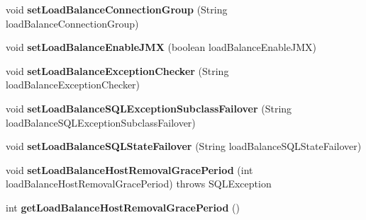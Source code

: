 \begin{DoxyCompactItemize}
void {\bfseries set\+Load\+Balance\+Connection\+Group} (String load\+Balance\+Connection\+Group)
\item 
\mbox{\label{classcom_1_1mysql_1_1jdbc_1_1_multi_host_my_s_q_l_connection_a1419d8c074ac22b801163e9b2eb5e1c7}} 
void {\bfseries set\+Load\+Balance\+Enable\+J\+MX} (boolean load\+Balance\+Enable\+J\+MX)
\item 
\mbox{\label{classcom_1_1mysql_1_1jdbc_1_1_multi_host_my_s_q_l_connection_aed4bfde5fc2c63060b4f3aec68188e06}} 
void {\bfseries set\+Load\+Balance\+Exception\+Checker} (String load\+Balance\+Exception\+Checker)
\item 
\mbox{\label{classcom_1_1mysql_1_1jdbc_1_1_multi_host_my_s_q_l_connection_a919d7aee542f3145d391d8612b4bba39}} 
void {\bfseries set\+Load\+Balance\+S\+Q\+L\+Exception\+Subclass\+Failover} (String load\+Balance\+S\+Q\+L\+Exception\+Subclass\+Failover)
\item 
\mbox{\label{classcom_1_1mysql_1_1jdbc_1_1_multi_host_my_s_q_l_connection_a203e4d05e4b3e87ebcdab8a84c49d3d1}} 
void {\bfseries set\+Load\+Balance\+S\+Q\+L\+State\+Failover} (String load\+Balance\+S\+Q\+L\+State\+Failover)
\item 
\mbox{\label{classcom_1_1mysql_1_1jdbc_1_1_multi_host_my_s_q_l_connection_a812043d46bdba8aac6305e78c0cbae9d}} 
void {\bfseries set\+Load\+Balance\+Host\+Removal\+Grace\+Period} (int load\+Balance\+Host\+Removal\+Grace\+Period)  throws S\+Q\+L\+Exception 
\item 
\mbox{\label{classcom_1_1mysql_1_1jdbc_1_1_multi_host_my_s_q_l_connection_aa4821fff2f9b9ce5361e8ed82791b454}} 
int {\bfseries get\+Load\+Balance\+Host\+Removal\+Grace\+Period} ()
\item 
\mbox{\label{classcom_1_1mysql_1_1jdbc_1_1_multi_host_my_s_q_l_connection_a417c84aad8797e867276b6719ab10213}} 

\end{DoxyCompactItemize}
